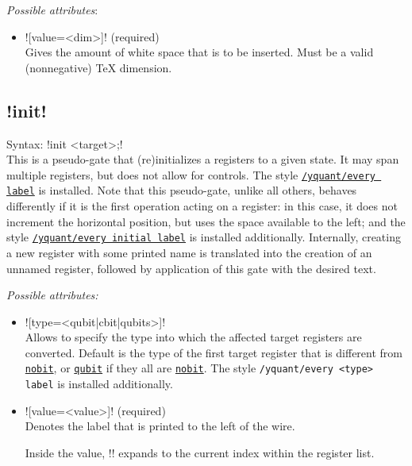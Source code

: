 \documentclass{scrartcl}
\def\gate#1{\hyperref[gate:#1]{\texttt{#1}}}
\def\style#1{\hyperref[style:#1]{\texttt{#1}}}
\begin{document}
         \emph{Possible attributes}:
         \begin{itemize}
            \item \yquant![value=<dim>]! (required) \\
               Gives the amount of white space that is to be inserted. Must be a valid (nonnegative) \TeX{} dimension.
         \end{itemize}

      \subsection[\texorpdfstring{\yquant!init!}{init}]{\yquant!init!}\label{gate:init}
         Syntax: \yquant!init <target>;! \\
         This is a pseudo\hyp gate that (re)initializes a registers to a given state.
         It may span multiple registers, but does not allow for controls.
         The style \style{/yquant/every label} is installed.
         Note that this pseudo\hyp gate, unlike all others, behaves differently if it is the first operation acting on a register: in this case, it does not increment the horizontal position, but uses the space available to the left; and the style \style{/yquant/every initial label} is installed additionally.
         Internally, creating a new register with some printed name is translated into the creation of an unnamed register, followed by application of this gate with the desired text.

         \emph{Possible attributes:}
         \begin{itemize}
            \item \yquant![type=<qubit|cbit|qubits>]! \\
               Allows to specify the type into which the affected target registers are converted.
               Default is the type of the first target register that is different from \gate{nobit}, or \gate{qubit} if they all are \gate{nobit}.
               The style \texttt{/yquant/every <type> label} is installed additionally.
            \item \yquant![value=<value>]! (required) \\
               Denotes the label that is printed to the left of the wire.

               Inside the value, \tex!\idx! expands to the current index within the register list.
         \end{itemize}
\end{document}
